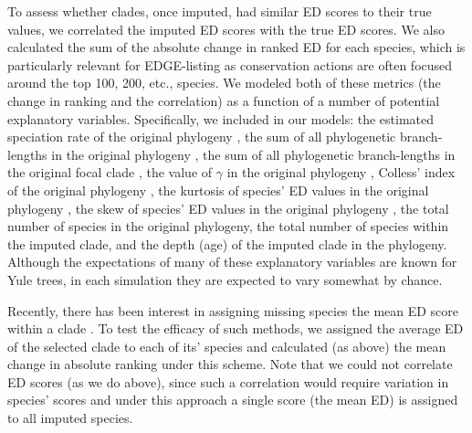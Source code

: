 \documentclass[10pt,english]{article}
\begin{document}
To assess whether clades, once imputed, had similar ED scores to their true
values, we correlated the imputed ED scores with the true ED scores. We also
calculated the sum of the absolute change in ranked ED for each species, which
is particularly relevant for EDGE-listing as conservation actions are often
focused around the top 100, 200, etc., species. We modeled both of these metrics
(the change in ranking and the correlation) as a function of a number of
potential explanatory variables. Specifically, we included in our models: the
estimated speciation rate of the original phylogeny \autocite[using
\texttt{ape::yule};][]{Paradis2004}, the sum of all phylogenetic branch-lengths
in the original phylogeny \autocite[Faith's PD;][]{Faith1992}, the sum of all
phylogenetic branch-lengths in the original focal clade \autocite[Faith's
PD;][]{Faith1992}, the value of $\gamma$ in the original phylogeny
\autocite[using \texttt{phytools::gammatest};][]{Pybus2000, Revell2012},
Colless' index of the original phylogeny
\autocite[using\texttt{apTreeshape::as.treeshape};][]{Colless1982,
Bortolussi2009}, the kurtosis of species' ED values in the original phylogeny
\autocite[using \texttt{moments::kurtosis};][]{Komsta2015}, the skew of species'
ED values in the original phylogeny \autocite[using
\texttt{moments::skew};][]{Komsta2015}, the total number of species in the
original phylogeny, the total number of species within the imputed clade, and
the depth (age) of the imputed clade in the phylogeny. Although the expectations
of many of these explanatory variables are known for Yule trees, in each
simulation they are expected to vary somewhat by chance.

Recently, there has been interest in assigning missing species the mean ED score
within a clade \autocite[see][]{Gumbs2018}. To test the efficacy of such
methods, we assigned the average ED of the selected clade to each of its'
species and calculated (as above) the mean change in absolute ranking under this
scheme. Note that we could not correlate ED scores (as we do above), since such
a correlation would require variation in species' scores and under this approach
a single score (the mean ED) is assigned to all imputed species.
\end{document}
